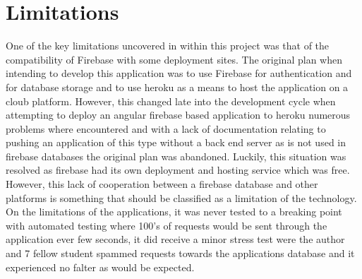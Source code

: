 \section{Limitations}
One of the key limitations uncovered in within this project was that of the compatibility of Firebase with some deployment sites. The original plan when intending to develop this application was to use Firebase for authentication and for database storage and to use heroku as a means to host the application on a cloub platform. However, this changed late into the development cycle when attempting to deploy an angular firebase based application to heroku numerous problems where encountered and with a lack of documentation relating to pushing an application of this type without a back end server as is not used in firebase databases the original plan was abandoned. Luckily, this situation was resolved as firebase had its own deployment and hosting service which was free. However, this lack of cooperation between a firebase database and other platforms is something that should be classified as a limitation of the technology. On the limitations of the applications, it was never tested to a breaking point with automated testing where 100's of requests would be sent through the application ever few seconds, it did receive a minor stress test were the author and 7 fellow student spammed requests towards the applications database and it experienced no falter as would be expected.


















